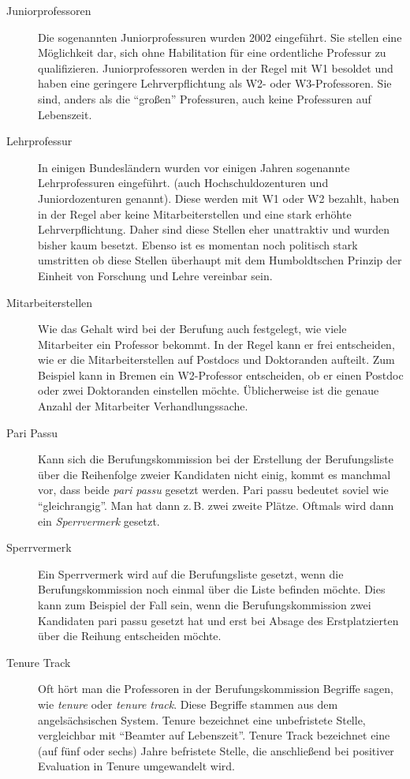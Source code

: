 \begin{description}
    \item [Juniorprofessoren]
          Die sogenannten Juniorprofessuren wurden 2002 eingeführt. Sie stellen eine Möglichkeit dar, sich
          ohne Habilitation für eine ordentliche Professur zu qualifizieren. Juniorprofessoren werden in der Regel mit W1
          besoldet und haben eine geringere Lehrverpflichtung als W2- oder W3-Professoren. Sie sind, anders als die "`großen"'
          Professuren, auch keine Professuren auf Lebenszeit.

    \item [Lehrprofessur]
          In einigen Bundesländern wurden vor einigen Jahren sogenannte Lehrprofessuren eingeführt.
          (auch Hochschuldozenturen und Juniordozenturen genannt). Diese werden mit W1 oder W2 bezahlt, haben
          in der Regel aber keine Mitarbeiterstellen und eine stark er\-höh\-te Lehrverpflichtung. Daher
          sind diese Stellen eher unattraktiv und wurden bisher kaum besetzt. Ebenso ist es momentan noch
          politisch stark umstritten ob diese Stellen überhaupt mit dem Humboldtschen Prinzip der Einheit
          von Forschung und Lehre vereinbar sein.

    \item [Mitarbeiterstellen]
          Wie das Gehalt wird bei der Berufung auch festgelegt, wie viele Mitarbeiter ein Professor bekommt.
          In der Regel kann er frei entscheiden, wie er die Mitarbeiterstellen auf Postdocs und Doktoranden
          aufteilt. Zum Beispiel kann in Bremen ein W2-Professor entscheiden, ob er einen Postdoc oder zwei
          Doktoranden einstellen möchte. Üblicherweise ist die genaue Anzahl der Mitarbeiter
          Verhandlungssache.

    \item [Pari Passu]
          Kann sich die Berufungskommission bei der Erstellung der Berufungsliste über die Reihenfolge zweier
          Kandidaten nicht einig, kommt es manchmal vor, dass beide \emph{pari passu} gesetzt werden. Pari passu
          bedeutet soviel wie "`gleichrangig"'. Man hat dann z.\,B. zwei zweite Plätze. Oftmals wird dann ein
          \emph{Sperrvermerk} gesetzt.

    \item [Sperrvermerk]
          Ein Sperrvermerk wird auf die Berufungsliste gesetzt, wenn die Berufungskommission noch einmal
          über die Liste befinden möchte. Dies kann zum Beispiel der Fall sein, wenn die Berufungskommission zwei Kandidaten
          pari passu gesetzt hat und erst bei Absage des Erstplatzierten über die Reihung entscheiden
          möchte.

    \item [Tenure Track]
          Oft hört man die Professoren in der Berufungskommission Begriffe sagen, wie \emph{tenure} oder \emph{tenure track}.
          Diese Begriffe stammen aus dem angelsächsischen System. Tenure bezeichnet eine unbefristete Stelle,
          vergleichbar mit "`Beamter auf Lebenszeit"'. Tenure Track bezeichnet eine (auf fünf oder sechs) Jahre
          befristete Stelle, die anschließend bei positiver Evaluation in Tenure umgewandelt wird.
\end{description}


